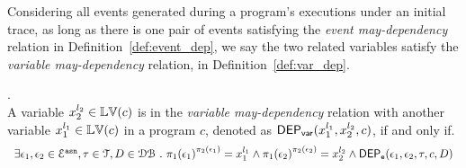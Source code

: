 Considering 
all events generated during a program's executions
under an initial trace,
as long as there is one pair of events satisfying the \emph{event may-dependency} relation in Definition~\ref{def:event_dep}, 
 we say the two 
related
variables satisfy the \emph{variable may-dependency} relation, in Definition~\ref{def:var_dep}.
\begin{defn}.
  \label{def:var_dep}
  \\
  A variable ${x}_2^{l_2} \in \mathbb{LV}(c)$ is in the \emph{variable may-dependency} relation with another
  variable ${x}_1^{l_1} \in \mathbb{LV}(c)$ in a program ${c}$, denoted as 
  $\mathsf{DEP_{var}}({x}_1^{l_1}, {x}_2^{l_2}, {c})$, if and only if.
\[
  \begin{array}{l}
\exists \event_1, \event_2 \in \eventset^{\asn}, \trace \in \mathcal{T} , D \in \dbdom \st
\pi_{1}{(\event_1)}^{\pi_{2}{(\event_1)}} = {x}_1^{l_1}
\land
\pi_{1}{(\event_2)}^{\pi_{2}{(\event_2)}} = {x}_2^{l_2}%
\land 
\eventdep(\event_1, \event_2, \trace, c, D) 
  \end{array}
\]  %
  \end{defn}
